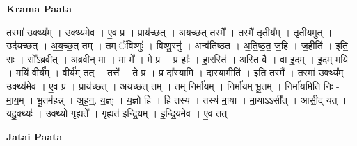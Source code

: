 \documentclass[17pt]{extarticle}
\begin{document}
\textbf{Krama Paata} \newline

तस्मा॑ उ॒क्थ्य᳚म् । उ॒क्थ्य॑मे॒व । ए॒व प्र । प्राय॑च्छत् । अ॒य॒च्छ॒त् तस्मै᳚ । तस्मै॑ तृ॒तीय᳚म् । तृ॒तीय॒मुत् । उद॑यच्छत् । अ॒य॒च्छ॒त् तम् । तम् ॅविष्णुः॑ । विष्णु॒रनु॑ । अन्व॑तिष्ठत । अ॒ति॒ष्ठ॒त॒ ज॒हि । ज॒हीति॑ । इति॒ सः । सो᳚ऽब्रवीत् । अ॒ब्र॒वी॒न् मा । मा मे᳚ । मे॒ प्र । प्र हाः᳚ । हा॒रस्ति॑ । अस्ति॒ वै । वा इ॒दम् । इ॒दम् मयि॑ । मयि॑ वी॒र्य᳚म् । वी॒र्य॑म् तत् । तत्ते᳚ । ते॒ प्र । प्र दा᳚स्यामि । दा॒स्या॒मीति॑ । इति॒ तस्मै᳚ । तस्मा॑ उ॒क्थ्य᳚म् । उ॒क्थ्य॑मे॒व । ए॒व प्र । प्राय॑च्छत् । अ॒य॒च्छ॒त् तम् । तम् निर्मा॑यम् । निर्मा॑यम् भू॒तम् । निर्मा॑य॒मिति॒ निः - मा॒य॒म् । भू॒तम॑हन्न् । अ॒ह॒न्॒. य॒ज्ञ्ः । य॒ज्ञो हि । हि तस्य॑ । तस्य॑ मा॒या । मा॒याऽऽसी᳚त् । आसी॒द् यत् । यदु॒क्थ्यः॑ । उ॒क्थ्यो॑ गृ॒ह्यते᳚ । गृ॒ह्यत॑ इन्द्रि॒यम् । इ॒न्द्रि॒यमे॒व । ए॒व तत् \newline

\textbf{Jatai Paata} \newline
\end{document}
